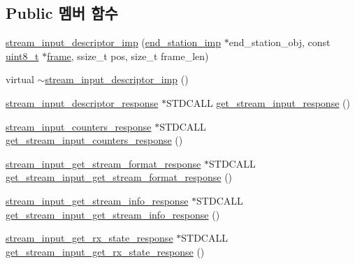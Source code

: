 \subsection*{Public 멤버 함수}
\begin{DoxyCompactItemize}
\item 
\hyperlink{classavdecc__lib_1_1stream__input__descriptor__imp_afc9adccd8abe24c727e2c135e0227d04}{stream\+\_\+input\+\_\+descriptor\+\_\+imp} (\hyperlink{classavdecc__lib_1_1end__station__imp}{end\+\_\+station\+\_\+imp} $\ast$end\+\_\+station\+\_\+obj, const \hyperlink{stdint_8h_aba7bc1797add20fe3efdf37ced1182c5}{uint8\+\_\+t} $\ast$\hyperlink{gst__avb__playbin_8c_ac8e710e0b5e994c0545d75d69868c6f0}{frame}, ssize\+\_\+t pos, size\+\_\+t frame\+\_\+len)
\item 
virtual \hyperlink{classavdecc__lib_1_1stream__input__descriptor__imp_ae3271bd84882043f384fd6431d04d737}{$\sim$stream\+\_\+input\+\_\+descriptor\+\_\+imp} ()
\item 
\hyperlink{classavdecc__lib_1_1stream__input__descriptor__response}{stream\+\_\+input\+\_\+descriptor\+\_\+response} $\ast$S\+T\+D\+C\+A\+LL \hyperlink{classavdecc__lib_1_1stream__input__descriptor__imp_ac485b8bb5da1823e61f46e7252f2f048}{get\+\_\+stream\+\_\+input\+\_\+response} ()
\item 
\hyperlink{classavdecc__lib_1_1stream__input__counters__response}{stream\+\_\+input\+\_\+counters\+\_\+response} $\ast$S\+T\+D\+C\+A\+LL \hyperlink{classavdecc__lib_1_1stream__input__descriptor__imp_ad400ba737689eaf3b599d029c012066b}{get\+\_\+stream\+\_\+input\+\_\+counters\+\_\+response} ()
\item 
\hyperlink{classavdecc__lib_1_1stream__input__get__stream__format__response}{stream\+\_\+input\+\_\+get\+\_\+stream\+\_\+format\+\_\+response} $\ast$S\+T\+D\+C\+A\+LL \hyperlink{classavdecc__lib_1_1stream__input__descriptor__imp_a615d3c4d029d707264a5395d5587909f}{get\+\_\+stream\+\_\+input\+\_\+get\+\_\+stream\+\_\+format\+\_\+response} ()
\item 
\hyperlink{classavdecc__lib_1_1stream__input__get__stream__info__response}{stream\+\_\+input\+\_\+get\+\_\+stream\+\_\+info\+\_\+response} $\ast$S\+T\+D\+C\+A\+LL \hyperlink{classavdecc__lib_1_1stream__input__descriptor__imp_aa1cf0d9641c882fd06e305efc51e77f4}{get\+\_\+stream\+\_\+input\+\_\+get\+\_\+stream\+\_\+info\+\_\+response} ()
\item 
\hyperlink{classavdecc__lib_1_1stream__input__get__rx__state__response}{stream\+\_\+input\+\_\+get\+\_\+rx\+\_\+state\+\_\+response} $\ast$S\+T\+D\+C\+A\+LL \hyperlink{classavdecc__lib_1_1stream__input__descriptor__imp_add40c2ed45d64b8d7e50f668ca6fc65a}{get\+\_\+stream\+\_\+input\+\_\+get\+\_\+rx\+\_\+state\+\_\+response} ()

\end{DoxyCompactItemize}
